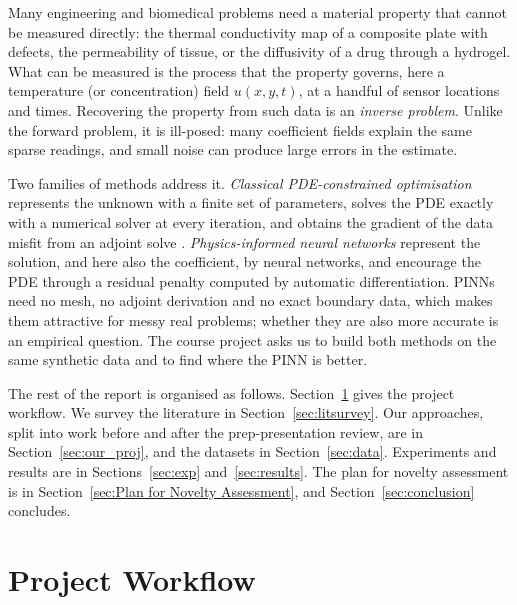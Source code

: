 \documentclass[twoside,english]{article}
\begin{document}
Many engineering and biomedical problems need a material property that cannot be measured directly: the thermal conductivity map of a composite plate with defects, the permeability of tissue, or the diffusivity of a drug through a hydrogel. What can be measured is the process that the property governs, here a temperature (or concentration) field $u(x,y,t)$, at a handful of sensor locations and times. Recovering the property from such data is an \emph{inverse problem}. Unlike the forward problem, it is ill-posed: many coefficient fields explain the same sparse readings, and small noise can produce large errors in the estimate.

Two families of methods address it. \emph{Classical PDE-constrained optimisation} represents the unknown with a finite set of parameters, solves the PDE exactly with a numerical solver at every iteration, and obtains the gradient of the data misfit from an adjoint solve \citep{vogel2002,plessix2006}. \emph{Physics-informed neural networks} \citep{raissi2019} represent the solution, and here also the coefficient, by neural networks, and encourage the PDE through a residual penalty computed by automatic differentiation. PINNs need no mesh, no adjoint derivation and no exact boundary data, which makes them attractive for messy real problems; whether they are also more accurate is an empirical question. The course project asks us to build both methods on the same synthetic data and to find where the PINN is better.

The rest of the report is organised as follows. Section~\ref{sec:workflow} gives the project workflow. We survey the literature in Section~\ref{sec:litsurvey}. Our approaches, split into work before and after the prep-presentation review, are in Section~\ref{sec:our_proj}, and the datasets in Section~\ref{sec:data}. Experiments and results are in Sections~\ref{sec:exp} and~\ref{sec:results}. The plan for novelty assessment is in Section~\ref{sec:Plan for Novelty Assessment}, and Section~\ref{sec:conclusion} concludes.

\section{Project Workflow} \label{sec:workflow}
\end{document}
